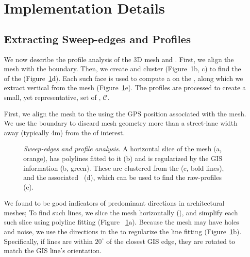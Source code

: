 \section{Implementation Details}
\label{sec:processing}


\subsection{Extracting Sweep-edges and Profiles}
\label{sec:profiles}

We now describe the profile analysis of the 3D mesh and \GISds.
%
First, we align the mesh with the \GISd boundary. Then,  we create and cluster \emph{\horizontallines} (Figure~\ref{fig:profs}b, c) to find the \emph{\prominentfaces} of the \block (Figure~\ref{fig:profs}d). Each such face is used to compute a {\em \sweepedge} on the \groundplane, along which we extract vertical {\em \rawprofiles} from the mesh (Figure~\ref{fig:profs}e). The profiles are processed to create a small, yet representative, set of {\em \cleanprofiles}, $\mathcal{C}$. 

First, we align the mesh to the \GISds  using the GPS position associated with the mesh. We use the \GISd boundary to discard mesh geometry more than a street-lane width away (typically 4m) from the \block of interest.

\begin{figure}[t!]
  \def\svgwidth{2.2\columnwidth}  
  \hspace*{-5mm}
  \vspace{-1cm}
  \caption{{\it Sweep-edges and profile analysis.}   A horizontal slice of the mesh (a, orange), has polylines fitted to it (b) and is regularized by the GIS information (b, green). These are clustered from the \seedlines (c, bold lines), and the associated \prominentfaces~(d), which can be used to find the raw-profiles (e). }
  \label{fig:profs}
\end{figure}

We found \horizontallines to be good indicators of predominant directions in architectural meshes;  To find such lines, we slice the mesh horizontally (), and simplify each such slice using polyline fitting (Figure ~\ref{fig:profs}a).
Because the mesh may have holes and noise, we use the directions in the \GISds to regularize the line fitting (Figure~\ref{fig:profs}b). 
Specifically, if lines are within $20^\circ$ of the closest GIS edge, they are rotated to match the GIS line's orientation.


